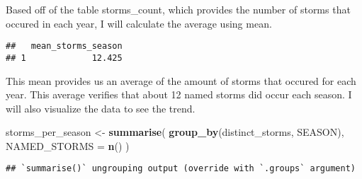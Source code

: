 \documentclass[
]{article}
\newenvironment{Shaded}{\begin{snugshade}}{\end{snugshade}}
\newcommand{\DataTypeTok}[1]{\textcolor[rgb]{0.13,0.29,0.53}{#1}}
\newcommand{\KeywordTok}[1]{\textcolor[rgb]{0.13,0.29,0.53}{\textbf{#1}}}
\newcommand{\NormalTok}[1]{#1}
\newcommand{\OperatorTok}[1]{\textcolor[rgb]{0.81,0.36,0.00}{\textbf{#1}}}
\newcommand{\OtherTok}[1]{\textcolor[rgb]{0.56,0.35,0.01}{#1}}
\newcommand{\StringTok}[1]{\textcolor[rgb]{0.31,0.60,0.02}{#1}}
\begin{document}
Based off of the table storms\_count, which provides the number of
storms that occured in each year, I will calculate the average using
mean.

\begin{Shaded}
\end{Shaded}

\begin{verbatim}
##   mean_storms_season
## 1             12.425
\end{verbatim}

This mean provides us an average of the amount of storms that occured
for each year. This average verifies that about 12 named storms did
occur each season. I will also visualize the data to see the trend.

\begin{Shaded}
\begin{Highlighting}[]
\NormalTok{storms_per_season <-}\StringTok{ }\KeywordTok{summarise}\NormalTok{(}
  \KeywordTok{group_by}\NormalTok{(distinct_storms, SEASON),}
  \DataTypeTok{NAMED_STORMS =} \KeywordTok{n}\NormalTok{()}
\NormalTok{)}
\end{Highlighting}
\end{Shaded}

\begin{verbatim}
## `summarise()` ungrouping output (override with `.groups` argument)
\end{verbatim}
\end{document}
